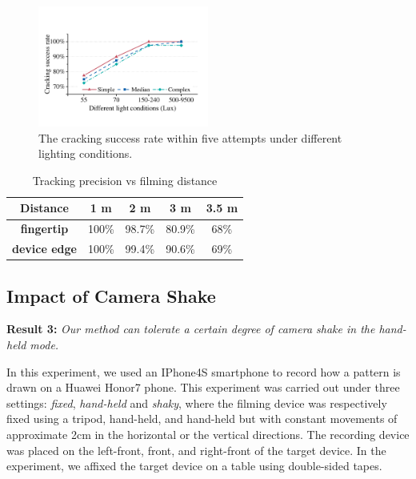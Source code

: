         \begin{figure}[t!]
            \centering
            \includegraphics[width=0.5\textwidth]{fig/light.pdf}
            \caption{The cracking success rate within five attempts under different lighting conditions.}
            \label{fig:light}
        \end{figure}

        \begin{table}[!t]
            \centering
            \caption{Tracking precision vs filming distance}
            \vspace{-0.2mm}
            \label{tab:tab1}
            \small
            \begin{tabular}{ccccc}
                \toprule
                \textbf{Distance}& 1 m & 2 m & 3 m & 3.5 m \\
                \midrule
                \textbf{fingertip}  & 100\% & 98.7\% & 80.9\% & 68\% \\
                \textbf{device edge} & 100\% & 99.4\% & 90.6\% & 69\% \\
                \bottomrule
            \end{tabular}
        \end{table}

    \subsection{Impact of Camera Shake}

    \noindent \textbf{Result 3:} \emph{Our method can tolerate a certain degree of camera shake in the hand-held mode.}

    In this experiment, we used an IPhone4S smartphone to record how a pattern is drawn on a Huawei Honor7 phone. This experiment was carried out under three settings:
    \emph{fixed}, \emph{hand-held} and \emph{shaky}, where the filming
    device was respectively fixed using a tripod, hand-held, and hand-held but with constant movements of
     approximate 2cm in the horizontal or the vertical directions. The recording device was placed on the left-front, front, and right-front of the target device.
    In the experiment, we affixed the target device on a table using double-sided tapes.



